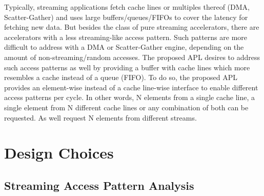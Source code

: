 Typically, streaming applications fetch cache lines or multiples thereof (DMA, Scatter-Gather) and uses large buffers/queues/FIFOs to cover the latency for fetching new data. But besides the class of pure streaming accelerators, there are accelerators with a less streaming-like access pattern. Such patterns are more difficult to address with a DMA or Scatter-Gather engine, depending on the amount of non-streaming/random accesses. The proposed APL desires to address such access patterns as well by providing a buffer with cache lines which more resembles a cache instead of a queue (FIFO). To do so, the proposed APL provides an element-wise instead of a cache line-wise interface to enable different access patterns per cycle. In other words, N elements from a single cache line, a single element from N different cache lines or any combination of both can be requested. As well request N elements from different streams.

\chapter{Design Choices}
\section{Streaming Access Pattern Analysis}


